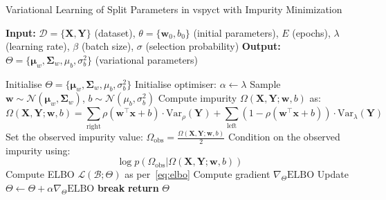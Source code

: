 \documentclass[3p,review,authoryear]{elsarticle}
\begin{document}
\begin{algorithm}[h!]
\caption{Variational Learning of Split Parameters in \gls{vspyct} with Impurity Minimization}
\label{alg:learn_split_vb}
\begin{algorithmic}[1]
    \State \textbf{Input:} $\mathcal{D} = \{\mathbf{X}, \mathbf{Y}\}$ (dataset), $\theta = \{\mathbf{w}_0, b_0\}$ (initial parameters), $E$ (epochs), $\lambda$ (learning rate), $\beta$ (batch size), $\sigma$ (selection probability)
    \State \textbf{Output:} $\Theta = \{\boldsymbol{\mu}_w, \boldsymbol{\Sigma}_w, \mu_b, \sigma_b^2\}$ (variational parameters)
 
        \State Initialise $\Theta = \{\boldsymbol{\mu}_w, \boldsymbol{\Sigma}_w, \mu_b, \sigma_b^2\}$ 
        \State Initialise optimiser: $\alpha \gets \lambda$
         
                \State Sample $\mathbf{w} \sim \mathcal{N}(\boldsymbol{\mu}_w, \boldsymbol{\Sigma}_w)$, $b \sim \mathcal{N}(\mu_b, \sigma_b^2)$
                \State Compute impurity $\Omega(\mathbf{X}, \mathbf{Y}; \mathbf{w}, b)$ as:
                \[
                \Omega(\mathbf{X}, \mathbf{Y}; \mathbf{w}, b) = \sum_{\text{right}} \rho(\mathbf{w}^\top \mathbf{x} + b) \cdot \text{Var}_\rho(\mathbf{Y}) + \sum_{\text{left}} (1 - \rho(\mathbf{w}^\top \mathbf{x} + b)) \cdot \text{Var}_\lambda(\mathbf{Y})
                \]
                \State Set the observed impurity value: $\Omega_\text{obs} = \frac{\Omega(\mathbf{X}, \mathbf{Y}; \mathbf{w}, b)}{2}$
                \State Condition on the observed impurity using:
                \[
                \log p(\Omega_\text{obs}|\Omega(\mathbf{X}, \mathbf{Y}; \mathbf{w}, b))
                \]
                \State Compute ELBO $\mathcal{L}(\mathcal{B}; \Theta)$ as per~\eqref{eq:elbo}
                \State Compute gradient $\nabla_{\Theta} \text{ELBO}$
                \State Update $\Theta \gets \Theta + \alpha \nabla_{\Theta} \text{ELBO}$ 
            \EndFor
                \State \textbf{break}
            \EndIf
        \EndFor
        \State \textbf{return} $\Theta$
    \EndProcedure
\end{algorithmic}
\end{algorithm}
\end{document}
